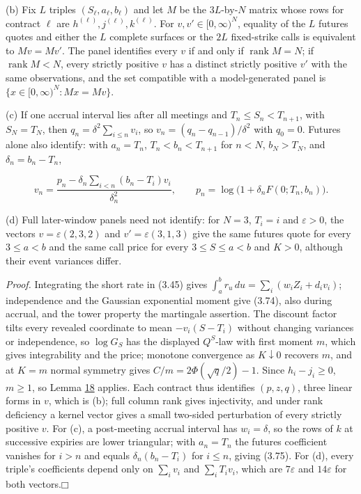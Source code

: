\documentclass[11pt]{article}
\providecommand{\square}{\mdlgwhtsquare}
\begin{document}
(b) Fix \(L\) triples \((S_\ell, a_\ell, b_\ell)\) and let \(M\) be the \(3L\)-by-\(N\) matrix whose rows for contract \(\ell\) are \(h^{(\ell)}, j^{(\ell)}, k^{(\ell)}\). For \(v, v' \in [0, \infty)^N\), equality of the \(L\) futures quotes and either the \(L\) complete surfaces or the \(2L\) fixed-strike calls is equivalent to \(Mv = Mv'\). The panel identifies every \(v\) if and only if \(\operatorname{rank} M = N\); if \(\operatorname{rank} M < N\), every strictly positive \(v\) has a distinct strictly positive \(v'\) with the same observations, and the set compatible with a model-generated panel is \(\{x \in [0, \infty)^N : Mx = Mv\}\).

(c) If one accrual interval lies after all meetings and \(T_n \le S_n < T_{n+1}\), with \(S_N = T_N\), then \(q_n = \delta^2 \sum_{i \le n} v_i\), so \(v_n = (q_n - q_{n-1}) / \delta^2\) with \(q_0 = 0\). Futures alone also identify: with \(a_n = T_n\), \(T_n < b_n < T_{n+1}\) for \(n < N\), \(b_N > T_N\), and \(\delta_n = b_n - T_n\),

\begin{equation*}
v_n = \frac{p_n - \delta_n \sum_{i < n} (b_n - T_i) v_i}{\delta_n^2}, \qquad p_n = \log\bigl( 1 + \delta_n F(0; T_n, b_n) \bigr). \tag{3.75}\label{eq:3.75}
\end{equation*}

(d) Full later-window panels need not identify: for \(N = 3\), \(T_i = i\) and \(\varepsilon > 0\), the vectors \(v = \varepsilon(2, 3, 2)\) and \(v' = \varepsilon(3, 1, 3)\) give the same futures quote for every \(3 \le a < b\) and the same call price for every \(3 \le S \le a < b\) and \(K > 0\), although their event variances differ.

\emph{Proof.} Integrating the short rate in (3.45) gives \(\int_a^b r_u\,du = \sum_i (w_i Z_i + d_i v_i)\); independence and the Gaussian exponential moment give (3.74), also during accrual, and the tower property the martingale assertion. The discount factor tilts every revealed coordinate to mean \(-v_i (S - T_i)\) without changing variances or independence, so \(\log G_S\) has the displayed \(Q^S\)-law with first moment \(m\), which gives integrability and the price; monotone convergence as \(K \downarrow 0\) recovers \(m\), and at \(K = m\) normal symmetry gives \(C / m = 2\Phi(\sqrt q / 2) - 1\). Since \(h_i - j_i \ge 0\), \(m \ge 1\), so Lemma \hyperref[res:Lemma-18]{18} applies. Each contract thus identifies \((p, z, q)\), three linear forms in \(v\), which is (b); full column rank gives injectivity, and under rank deficiency a kernel vector gives a small two-sided perturbation of every strictly positive \(v\). For (c), a post-meeting accrual interval has \(w_i = \delta\), so the rows of \(k\) at successive expiries are lower triangular; with \(a_n = T_n\) the futures coefficient vanishes for \(i > n\) and equals \(\delta_n (b_n - T_i)\) for \(i \le n\), giving (3.75). For (d), every triple's coefficients depend only on \(\sum_i v_i\) and \(\sum_i T_i v_i\), which are \(7\varepsilon\) and \(14\varepsilon\) for both vectors.\hfill$\square$
\end{document}
